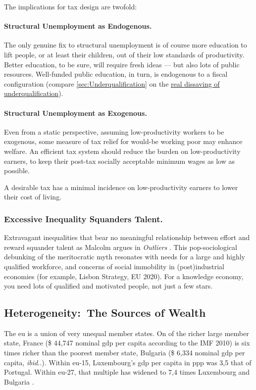 The implications for tax design are twofold:

\paragraph{Structural Unemployment as Endogenous.}
The only genuine fix to structural unemployment is of course more education to lift people, or at least their children, out of their low standards of productivity.
Better education, to be sure, will require fresh ideas --- but also lots of public resources.
Well-funded public education, in turn, is endogenous to a fiscal configuration (compare \autoref{sec:Underqualification} on the \hyperref[sec:Underqualification]{real dissaving of underqualification}).

\paragraph{Structural Unemployment as Exogenous.}
Even from a static perspective, assuming low-productivity workers to be exogenous, some measure of tax relief for would-be working poor may enhance welfare.
An efficient tax system should reduce the burden on low-productivity earners, to keep their post-tax socially acceptable minimum wages as low as possible.
\newpage
\begin{desideratum}
	\label{des:low-price-floor}
	A desirable tax has a minimal incidence on low-productivity earners to lower their cost of living.
\end{desideratum}

\subsubsection{Excessive Inequality Squanders Talent.}
Extravagant inequalities that bear no meaningful relationship between effort and reward squander talent as Malcolm \citeauthor{Gladwell} argues in \emph{Outliers} \citeyearpar{Gladwell}.
This pop-sociological debunking of the meritocratic myth resonates with needs
for a large and highly qualified workforce, and concerns of social immobility in (post)industrial economies (for example, Lisbon Strategy, EU 2020).
For a knowledge economy, you need lots of qualified and motivated people, not just a few stars.

\subsection[Heterogeneity]{Heterogeneity:\ The Sources of Wealth}
	\label{sec:sources-of-wealth}
The \gls{eu} is a union of very unequal member states.
On of the richer large member state, France (\$ 44,747 nominal \gls{gdp} per capita according to the IMF 2010) is six times richer than the poorest member state, Bulgaria (\$ 6,334 nominal \gls{gdp} per capita, \emph{ibid.}.).
Within \gls{eu}-15, Luxembourg's \gls{gdp} per capita in \gls{ppp} was 3,5 that of Portugal.
Within \gls{eu}-27, that multiple has widened to 7,4 times Luxembourg and Bulgaria \citep[1]{Alber2008}.

